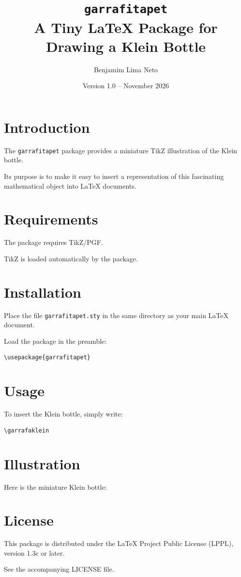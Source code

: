 \documentclass[12pt,a4paper]{article}
\title{\texttt{garrafitapet}\\
\large A Tiny LaTeX Package for Drawing a Klein Bottle}
\author{Benjamim Lima Neto}
\date{Version 1.0 -- November 2026}
\begin{document}
\maketitle

\section{Introduction}

The \texttt{garrafitapet} package provides
a miniature TikZ illustration of the Klein bottle.

Its purpose is to make it easy to insert a
representation of this fascinating mathematical
object into LaTeX documents.

\section{Requirements}

The package requires TikZ/PGF.

TikZ is loaded automatically by the package.

\section{Installation}

Place the file \texttt{garrafitapet.sty}
in the same directory as your main LaTeX document.

Load the package in the preamble:

\begin{verbatim}
\usepackage{garrafitapet}
\end{verbatim}

\section{Usage}

To insert the Klein bottle, simply write:

\begin{verbatim}
\garrafaklein
\end{verbatim}

\section{Illustration}

Here is the miniature Klein bottle:

\begin{center}
\garrafaklein
\end{center}

\section{License}

This package is distributed under the
LaTeX Project Public License (LPPL),
version 1.3c or later.

See the accompanying LICENSE file.
\end{document}
